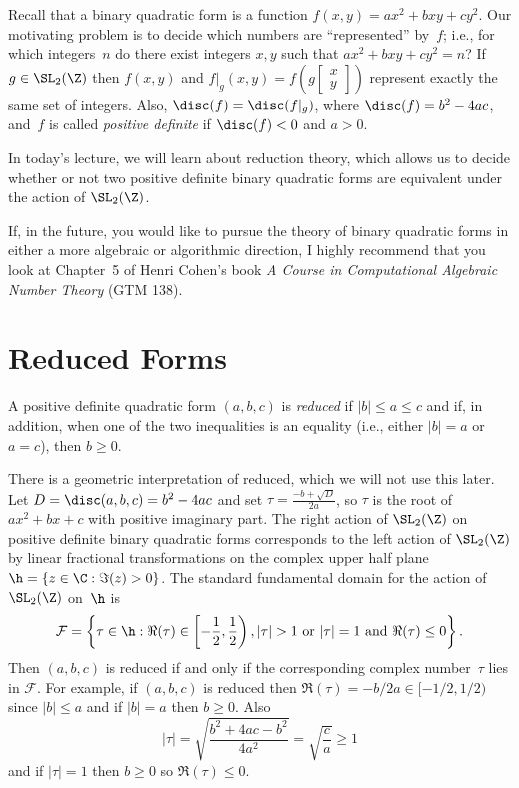 \documentclass[11pt]{report}
\renewcommand{\vtwo}[2]{\left[
        \begin{matrix}#1\\#2
        \end{matrix}\right]}
\begin{document}
Recall that a binary quadratic form is a function
$f(x,y) = ax^2 + bxy+cy^2$.  Our motivating problem
is to decide which numbers are ``represented'' by~$f$;
i.e., for which integers~$n$ do there exist integers
$x, y$ such that $ax^2 + bxy + cy^2 = n$?  If $g\in\SL_2(\Z)$
then $f(x,y)$ and $f|_g(x,y) = f\left(g\vtwo{x}{y}\right)$ represent
exactly the same set of integers.  Also, $\disc(f)=\disc(f|_g)$,
where
$\disc(f) = b^2 - 4ac$,
and~$f$ is called {\em positive definite}
if $\disc(f)<0$ and $a>0$.

In today's lecture, we will learn about reduction theory, which
allows us to decide whether or not two positive definite binary
quadratic forms are equivalent under the action of $\SL_2(\Z)$.

If, in the future, you would like to pursue the theory of binary
quadratic forms in either a more algebraic or algorithmic direction, I
highly recommend that you look at Chapter~5 of Henri Cohen's book {\em
    A Course in Computational Algebraic Number Theory} (GTM 138).


\section{Reduced Forms}
\begin{definition}[Reduced]
  A positive definite quadratic form $(a,b,c)$ is {\em reduced}
  if $|b|\leq a \leq c$ and if, in addition, when one of the
  two inequalities is an equality (i.e., either $|b|=a$ or $a=c$),
  then $b\geq 0$.
\end{definition}


There is a geometric interpretation of reduced, which we will not
use this later.  Let $D=\disc(a,b,c) = b^2 - 4ac$ and set $\tau =
  \frac{-b+\sqrt{D}}{2a}$, so $\tau$ is the root of $ax^2 + bx + c$
with positive imaginary part.  The right action of $\SL_2(\Z)$ on
positive definite binary quadratic forms corresponds to the left
action of $\SL_2(\Z)$ by linear fractional transformations on the
complex upper half plane $\h = \{z \in \C : \Im(z)>0\}$.  The standard
fundamental domain for the action of $\SL_2(\Z)$ on~$\h$ is
$$\mathcal{F} = \left\{\tau \in \h : \Re(\tau)\in\left[-\frac{1}{2},\frac{1}{2}\right),
  |\tau|>1 \text{ or } |\tau|=1\text{ and }\Re(\tau)\leq 0\right\}.$$
Then $(a,b,c)$ is reduced if and only if the corresponding complex
number~$\tau$ lies in $\mathcal{F}$.  For example, if $(a,b,c)$
is reduced then $\Re(\tau) = -b/2a\in[-1/2,1/2)$ since
$|b|\leq a$ and if $|b|=a$ then $b\geq 0$.  Also
$$
  |\tau| = \sqrt{\frac{b^2 + 4ac - b^2}{4a^2}}
  = \sqrt{\frac{c}{a}} \geq 1$$
and if $|\tau|=1$ then $b\geq 0$ so $\Re(\tau) \leq 0$.
\end{document}
